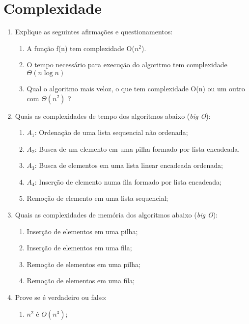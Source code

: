 \documentclass[12pt]{article}
\begin{document}
\section*{Complexidade}
\begin{enumerate}[resume,label=\textbf{Q\arabic*}]
    \item Explique as seguintes afirmações e questionamentos:
          \begin{enumerate}
              \item A função f(n) tem complexidade O($n^2$).
              \item O tempo necessário para execução do algoritmo tem complexidade $\Theta(n \log n)$
              \item Qual o algoritmo mais veloz, o que tem complexidade O(n) ou um outro com $\Theta(n^2)$ ?
          \end{enumerate}
    \item Quais as complexidades de tempo dos algoritmos abaixo (\emph{big O}):
          \begin{enumerate}
              \item $A_1$: Ordenação de uma lista sequencial não ordenada;
              \item $A_2$: Busca de um elemento em uma pilha formado por lista encadeada.
              \item $A_3$: Busca de elementos em uma lista linear encadeada ordenada;
              \item $A_4$: Inserção de elemento numa fila formado por lista encadeada;
              \item Remoção de elemento em uma lista sequencial;
          \end{enumerate}
    \item Quais as complexidades de memória dos algoritmos abaixo (\emph{big O}):
          \begin{enumerate}
              \item Inserção de elementos em uma pilha;
              \item Inserção de elementos em uma fila;
              \item Remoção de elementos em uma pilha;
              \item Remoção de elementos em uma fila;
          \end{enumerate}
    \item Prove se é verdadeiro ou falso:
          \begin{enumerate}
              \item $n^2$ é $O(n^3)$;

\end{enumerate}
\end{enumerate}
\end{document}
